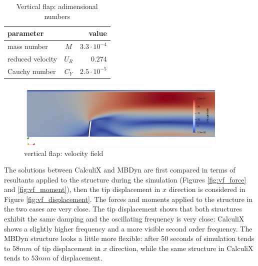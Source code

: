 \begin{table}[!htb]
	\begin{center}
		\begin{tabular}{ l c | r } 
			parameter & & value   \\ 
			\hline
			mass number  & $M$ & $3.3\cdot 10^{-4}$     \\
			reduced velocity & $U_R$ & $0.274$  \\
			Cauchy number  & $C_Y$ & $2.5\cdot 10^{-5}$  \\			
		\end{tabular}
	\end{center}
	\caption{Vertical flap: adimensional numbers}
	\label{table:ex1-adim}
\end{table}

\begin{figure}[htbp!]
	\centering
	\includegraphics[width=0.9\textwidth]{images/vert_flap/vert_flap1.png}
	\caption{vertical flap: velocity field}
	\label{fig:vf_sol}
\end{figure}


The solutions between CalculiX and MBDyn are first compared in terms of resultants applied to the structure during the simulation (Figures \ref{fig:vf_force} and \ref{fig:vf_moment}), then the tip displacement in $x$ direction is considered in Figure \ref{fig:vf_displacement}. The forces and moments applied to the structure in the two cases are very close. 
The tip displacement shows that both structures exhibit the same damping and the oscillating frequency is very close: CalculiX shows a slightly higher frequency and a more visible second order frequency. The MBDyn structure looks a little more flexible: after 50 seconds of simulation tends to $58mm$ of tip displacement in $x$ direction, while the same structure in CalculiX tends to $53mm$ of displacement. 

